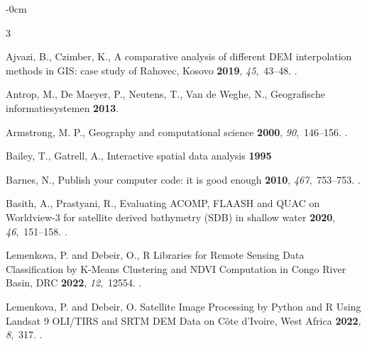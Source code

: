 \documentclass[technologies,article,submit,pdftex,moreauthors]{Definitions/mdpi}
\begin{document}
\begin{adjustwidth}{-\extralength}{0cm}


\begin{thebibliography}{3}

 Ajvazi, B., Czimber, K., 
\newblock A comparative analysis of different DEM interpolation methods in GIS: case study of Rahovec, Kosovo
 {\bf 2019}, {\em 45},~43--48. 
.

 Antrop, M., De Maeyer, P., Neutens, T., Van de Weghe, N.,
\newblock Geografische informatiesystemen
 {\bf 2013}. 

 Armstrong, M. P., 
\newblock Geography and computational science
 {\bf 2000}, {\em 90},~146--156. 
.

 Bailey, T., Gatrell, A., 
\newblock Interactive spatial data analysis
 {\bf 1995}

 Barnes, N., 
\newblock Publish your computer code: it is good enough
 {\bf 2010}, {\em 467},~753--753. 
.

Basith, A., Prastyani, R.,
\newblock Evaluating ACOMP, FLAASH and QUAC on Worldview-3 for satellite derived bathymetry (SDB) in shallow water
 {\bf 2020}, {\em 46},~151--158. 
.

Lemenkova, P. and Debeir, O.,
\newblock R Libraries for Remote Sensing Data Classification by K-Means Clustering and NDVI Computation in Congo River Basin, DRC
 {\bf 2022}, {\em 12},~12554. 
.

Lemenkova, P. and Debeir, O.
\newblock Satellite Image Processing by Python and R Using Landsat 9 OLI/TIRS and SRTM DEM Data on Côte d'Ivoire, West Africa
 {\bf 2022}, {\em 8},~317. 
.


\end{thebibliography}
\end{adjustwidth}
\end{document}
